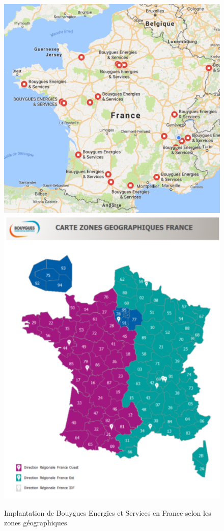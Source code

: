 \documentclass[a4paper]{article}
\begin{document}
    \begin{figure}[H]
    \includegraphics[scale=0.5]{img/implantationFrance}
    \includegraphics[scale=0.5]{img/ZGFrance}
    \caption{Implantation de Bouygues Energies et Services en France selon les zones géographiques}
    \end{figure}
\end{document}
